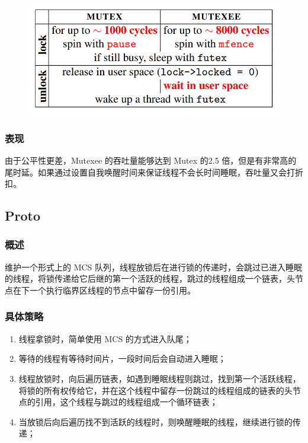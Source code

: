 \documentclass[UTF8]{ctexart}
\begin{document}
\begin{figure}[ht]
    \centering
    \includegraphics[scale=0.4]{images/img3.png}
\end{figure}

\subsubsection{表现}

由于公平性更差，Mutexee 的吞吐量能够达到 Mutex 的2.5 倍，但是有非常高的尾时延。如果通过设置自我唤醒时间来保证线程不会长时间睡眠，吞吐量又会打折扣。

\subsection{Proto}

\subsubsection{概述}

维护一个形式上的 MCS 队列，线程放锁后在进行锁的传递时，会跳过已进入睡眠的线程，将锁传递给它后继的第一个活跃的线程，跳过的线程组成一个链表，头节点在下一个执行临界区线程的节点中留存一份引用。

\subsubsection{具体策略}
\begin{enumerate}
    \item 线程拿锁时，简单使用 MCS 的方式进入队尾；
    \item 等待的线程有等待时间片，一段时间后会自动进入睡眠；
    \item 线程放锁时，向后遍历链表，如遇到睡眠线程则跳过，找到第一个活跃线程，将锁的所有权传给它，并在这个线程中留存一份跳过的线程组成的链表的头节点的引用，这个线程与跳过的线程组成一个循环链表；
    \item 当放锁后向后遍历找不到活跃的线程时，则唤醒睡眠的线程，继续进行锁的传递；
\end{enumerate}
\end{document}
